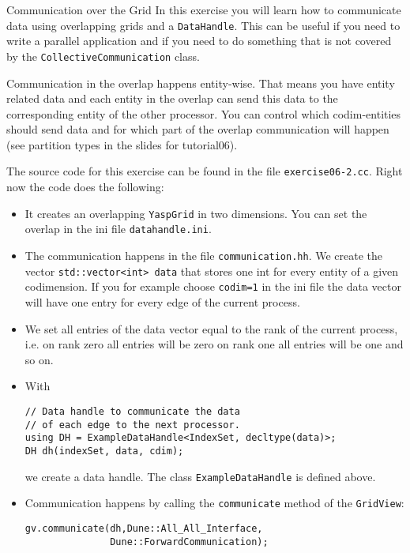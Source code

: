 \documentclass[12pt,a4paper]{article}
\begin{document}
\begin{Exercise}{Communication over the Grid}
  In this exercise you will learn how to communicate data using overlapping
  grids and a \lstinline{DataHandle}. This can be useful if you need to write a
  parallel application and if you need to do something that is not covered by
  the \lstinline{CollectiveCommunication} class.

  Communication in the overlap happens entity-wise. That means you have entity
  related data and each entity in the overlap can send this data to the
  corresponding entity of the other processor. You can control which
  codim-entities should send data and for which part of the overlap
  communication will happen (see partition types in the slides for tutorial06).

  The source code for this exercise can be found in the file
  \lstinline{exercise06-2.cc}. Right now the code does the following:
  \begin{itemize}
  \item It creates an overlapping \lstinline{YaspGrid} in two
    dimensions. You can set the overlap in the ini file
    \lstinline{datahandle.ini}.
  \item The communication happens in the file
    \lstinline{communication.hh}.  We create the vector
    \lstinline{std::vector<int> data} that stores one int for every
    entity of a given codimension. If you for example choose
    \lstinline{codim=1} in the ini file the data vector will have one
    entry for every edge of the current process.
  \item We set all entries of the data vector equal to the rank of the
    current process, i.e. on rank zero all entries will be zero on
    rank one all entries will be one and so on.
  \item With
    \begin{lstlisting}
// Data handle to communicate the data
// of each edge to the next processor.
using DH = ExampleDataHandle<IndexSet, decltype(data)>;
DH dh(indexSet, data, cdim);
    \end{lstlisting}
    we create a data handle. The class \lstinline{ExampleDataHandle}
    is defined above.
  \item Communication happens by calling the \lstinline{communicate}
    method of the \lstinline{GridView}:
    \begin{lstlisting}
gv.communicate(dh,Dune::All_All_Interface,
               Dune::ForwardCommunication);
    \end{lstlisting}

\end{itemize}
\end{Exercise}
\end{document}
